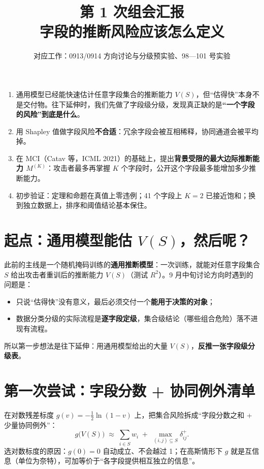 \documentclass[zihao=-4,a4paper]{ctexart}
\title{\textbf{第 1 次组会汇报}\\[4pt]\Large 字段的推断风险应该怎么定义}
\author{对应工作：0913/0914 方向讨论与分级预实验、98—101 号实验}
\date{}
\newcommand{\M}{M^{(K)}}
\begin{document}
\maketitle
\thispagestyle{empty}

\begin{keybox}
\begin{enumerate}[leftmargin=*]
  \item 通用模型已经能快速估计任意字段集合的推断能力 $V(S)$，但“估得快”本身不是交付物。往下延伸时，我们先做了字段级分级，发现真正缺的是\textbf{“一个字段的风险”到底是什么}。
  \item 用 Shapley 值做字段风险\textbf{不合适}：冗余字段会被互相稀释，协同通道会被平均掉。
  \item 在 MCI（Catav 等，ICML 2021）的基础上，提出\textbf{背景受限的最大边际推断能力 $\M$}：攻击者最多再掌握 $K$ 个字段时，公开这个字段最多能增加多少推断能力。
  \item 初步验证：定理和命题在真值上零违例；41 个字段上 $K=2$ 已接近饱和；换到独立数据上，排序和阈值结论基本保住。
\end{enumerate}
\end{keybox}

\section{起点：通用模型能估 $V(S)$，然后呢？}

此前的主线是一个随机掩码训练的\textbf{通用推断模型}：一次训练，就能对任意字段集合 $S$ 给出攻击者重训后的推断能力 $V(S)$（测试 $R^2$）。9 月中旬讨论方向时遇到的问题是：

\begin{itemize}[leftmargin=*]
  \item 只说“估得快”没有意义，最后必须交付一个\textbf{能用于决策的对象}；
  \item 数据分类分级的实际流程是\textbf{逐字段定级}，集合级结论（哪些组合危险）落不进现有流程。
\end{itemize}

所以第一步想法是往下延伸：用通用模型给出的大量 $V(S)$，\textbf{反推一张字段级分级表}。

\section{第一次尝试：字段分数 + 协同例外清单}

在对数残差标度 $g(v)=-\tfrac12\ln(1-v)$ 上，把集合风险拆成“字段分数之和 + 少量协同例外”：
\[
  g\big(V(S)\big)\;\approx\;\sum_{i\in S} w_i \;+\; \max_{(i,j)\subseteq S}\delta^{+}_{ij}.
\]
选对数标度的原因：$g(0)=0$ 自动成立、不会越过 1；在高斯情形下 $g$ 就是互信息（单位为奈特），可加等价于“各字段提供相互独立的信息”。
\end{document}
